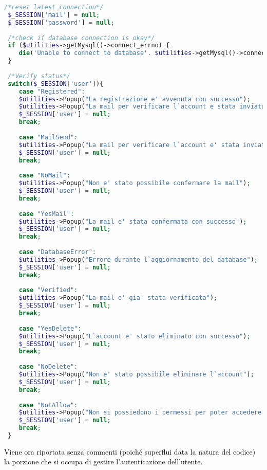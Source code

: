  \begin{lstlisting}[language=php]
 /*reset latest connection*/
 $_SESSION['mail'] = null;
 $_SESSION['password'] = null;
 
 /*check if database connection is okay*/
 if ($utilities->getMysql()->connect_errno) {
 	die('Unable to connect to database'. $utilities->getMysql()->connect_error);
 }
 
 /*Verify status*/
 switch($_SESSION['user']){
 	case "Registered":
 	$utilities->Popup("La registrazione e' avvenuta con successo");
 	$utilities->Popup("La mail per verificare l`account e stata inviata");
 	$_SESSION['user'] = null;
 	break;
 	
 	case "MailSend":
 	$utilities->Popup("La mail per verificare l`account e' stata inviata");
 	$_SESSION['user'] = null;
 	break;
 	
 	case "NoMail":
 	$utilities->Popup("Non e' stato possibile confermare la mail");
 	$_SESSION['user'] = null;
 	break;
 	
 	case "YesMail":
 	$utilities->Popup("La mail e' stata confermata con successo");
 	$_SESSION['user'] = null;
 	break;
 	
 	case "DatabaseError":
 	$utilities->Popup("Errore durante l`aggiornamento del database");
 	$_SESSION['user'] = null;
 	break;
 	
 	case "Verified":
 	$utilities->Popup("La mail e' gia' stata verificata");
 	$_SESSION['user'] = null;
 	break;
 	
 	case "YesDelete":
 	$utilities->Popup("L`account e' stato eliminato con successo");
 	$_SESSION['user'] = null;
 	break;
 	
 	case "NoDelete":
 	$utilities->Popup("Non e' stato possibile eliminare l`account");
 	$_SESSION['user'] = null;
 	break;
 	
 	case "NotAllow":
 	$utilities->Popup("Non si possiedono i permessi per poter accedere alla pagina");
 	$_SESSION['user'] = null;
 	break;
 }
\end{lstlisting}

 \textcolor{black}{Viene ora riportata senza commenti (poiché superflui data la natura del codice) la porzione che si occupa di gestire l'autenticazione dell'utente.}\\ 

